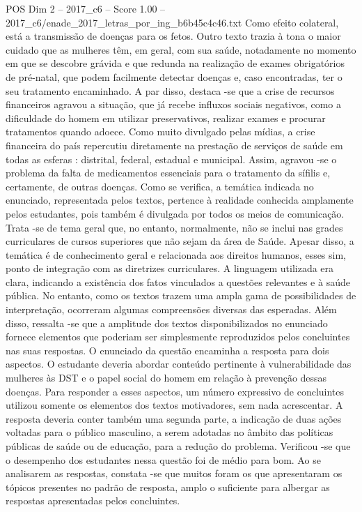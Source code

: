 \begin{textsample}{POS Dim 2 – 2017\_c6 – Score 1.00 – 2017\_c6/enade\_2017\_letras\_por\_ing\_b6b45c4c46.txt}
Como efeito colateral, está a transmissão de doenças para os fetos.
Outro texto trazia à tona o maior cuidado que as mulheres têm, em geral, com sua saúde, notadamente no momento em que se descobre grávida e que redunda na realização de exames obrigatórios de pré-natal, que podem facilmente detectar doenças e, caso encontradas, ter o seu tratamento encaminhado.
A par disso, destaca -se que a crise de recursos financeiros agravou a situação, que já recebe influxos sociais negativos, como a dificuldade do homem em utilizar preservativos, realizar exames e procurar tratamentos quando adoece.
Como muito divulgado pelas mídias, a crise financeira do país repercutiu diretamente na prestação de serviços de saúde em todas as esferas : distrital, federal, estadual e municipal.
Assim, agravou -se o problema da falta de medicamentos essenciais para o tratamento da sífilis e, certamente, de outras doenças.
Como se verifica, a temática indicada no enunciado, representada pelos textos, pertence à realidade conhecida amplamente pelos estudantes, pois também é divulgada por todos os meios de comunicação.
Trata -se de tema geral que, no entanto, normalmente, não se inclui nas grades curriculares de cursos superiores que não sejam da área de Saúde.
Apesar disso, a temática é de conhecimento geral e relacionada aos direitos humanos, esses sim, ponto de integração com as diretrizes curriculares.
A linguagem utilizada era clara, indicando a existência dos fatos vinculados a questões relevantes e à saúde pública.
No entanto, como os textos trazem uma ampla gama de possibilidades de interpretação, ocorreram algumas compreensões diversas das esperadas.
Além disso, ressalta -se que a amplitude dos textos disponibilizados no enunciado fornece elementos que poderiam ser simplesmente reproduzidos pelos concluintes nas suas respostas.
O enunciado da questão encaminha a resposta para dois aspectos.
O estudante deveria abordar conteúdo pertinente à vulnerabilidade das mulheres às DST e o papel social do homem em relação à prevenção dessas doenças.
Para responder a esses aspectos, um número expressivo de concluintes utilizou somente os elementos dos textos motivadores, sem nada acrescentar.
A resposta deveria conter também uma segunda parte, a indicação de duas ações voltadas para o público masculino, a serem adotadas no âmbito das políticas públicas de saúde ou de educação, para a redução do problema.
Verificou -se que o desempenho dos estudantes nessa questão foi de médio para bom.
Ao se analisarem as respostas, constata -se que muitos foram os que apresentaram os tópicos presentes no padrão de resposta, amplo o suficiente para albergar as respostas apresentadas pelos concluintes.

\end{textsample}
